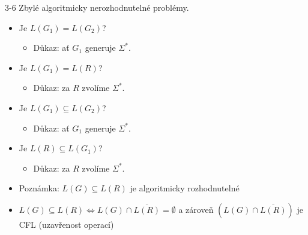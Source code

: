    
    \begin{frame}{}
    \begin{proofm}{3-6}
    Zbylé algoritmicky nerozhodnutelné problémy.
    \begin{itemize}
        \item[3] 	 Je $L(G_1)= L(G_2)$? 
    \begin{itemize}
        \item 	Důkaz: ať $G_1$ generuje $\Sigma^*$.
    \end{itemize}
    \pause
    \item[4] 	 Je $L(G_1)= L(R)$?
    \begin{itemize}
        \item  Důkaz: za $R$ zvolíme $\Sigma^*$.
    \end{itemize}
    \pause
    \item[5] 	 Je $L(G_1)\subseteq L(G_2)$?
    \begin{itemize}
        \item  Důkaz: ať $G_1$ generuje $\Sigma^*$.
    \end{itemize}
    \pause
    \item[6] 
         Je $L(R)\subseteq L(G_1)$?
    \begin{itemize}
        \item 	Důkaz: za $R$ zvolíme $\Sigma^*$.
    \end{itemize}
    \end{itemize}

    \end{proofm}
    \pause
    \begin{itemize}
        \item Poznámka: $L(G)\subseteq L(R)$ je algoritmicky rozhodnutelné
        \item[] $L(G)\subseteq L(R) \Leftrightarrow L(G)\cap \overline{L(R)}=\emptyset$ a zároveň $(L(G)\cap \overline{L(R)})$ je CFL (uzavřenost operací)
    \end{itemize}
    \end{frame}
    
